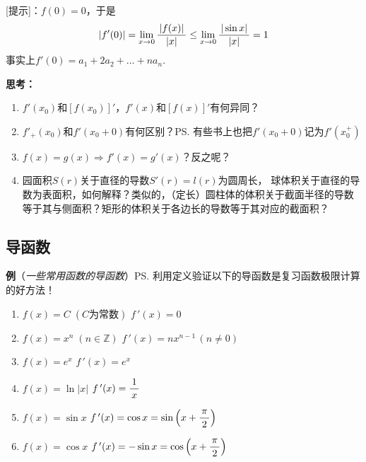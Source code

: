 [提示]：$f(0)=0$，于是
$$|f'(0)|=\lim\limits_{x\to{0}}\displaystyle\frac{\,{|f(x)|}\,}{\,{|x|}\,}\leq\lim\limits_{x\to{0}}\displaystyle\frac{\,{|\sin x|}\,}{\,{|x|}\,}=1$$
事实上$f'(0)=a_1+2a_2+\ldots+na_n$.

{\bf 思考：}
\begin{enumerate} 
  \setlength{\itemindent}{1cm}
  \item $f'(x_0)$和$[f(x_0)]'$，$f'(x)$和$[f(x)]'$有何异同？
  \item $f'_+(x_0)$和$f'(x_0+0)$有何区别？\ps{有些书上也把$f'(x_0+0)$记为$f'(x_0^+)$}
  \item $f(x)=g(x)\Rightarrow f'(x)=g'(x)$？反之呢？
  \item 园面积$S(r)$关于直径的导数$S'(r)=l(r)$为圆周长，
  球体积关于直径的导数为表面积，如何解释？类似的，（定长）圆柱体的体积关于截面半径的导数
  等于其与侧面积？矩形的体积关于各边长的导数等于其对应的截面积？
\end{enumerate}

\subsection{导函数}

{\bf 例}（{\it 一些常用函数的导函数}）\ps{利用定义验证以下的导函数是复习函数极限计算的好方法！}
\begin{enumerate}[(1)]
  \setlength{\itemindent}{1cm}
  \item $f(x)=C\;(C\mbox{为常数})$ \hfill $f\,'(x)=0$ 
  \item $f(x)=x^n\;(n\in\mathbb{Z})$ \hfill $f\,'(x)=nx^{n-1}\,(n\ne
  0)$ 
  \item $f(x)=e^x$ \hfill $f\,'(x)=e^x$ 
  \item $f(x)=\ln|x|$ \hfill $f\,'(x)=\displaystyle\frac{\,{1}\,}{\,{x}\,}$ 
  \item $f(x)=\sin x$ \hfill $f\,'(x)=\cos x=\sin\left(x+\displaystyle\frac{\,{\pi}\,}{\,{2}\,}\right)$ 
  \item $f(x)=\cos x$ \hfill $f\,'(x)=-\sin x=\cos\left(x+\displaystyle\frac{\,{\pi}\,}{\,{2}\,}\right)$
\end{enumerate}

